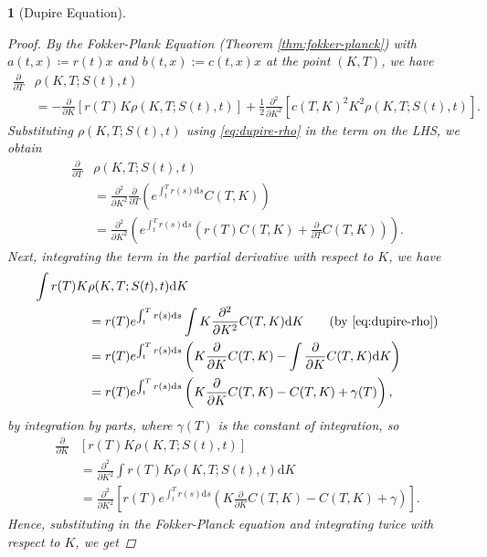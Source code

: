 \documentclass[english]{article}
\numberwithin{equation}{section}
\numberwithin{figure}{section}
\theoremstyle{bolddescit}
\newtheorem{theorem}{\protect\theoremname}[section]
\theoremstyle{definition}
\theoremstyle{definition}
\theoremstyle{plain}
\theoremstyle{plain}
\theoremstyle{bolddesc}
\theoremstyle{plain}
\theoremstyle{remark}
\providecommand{\theoremname}{Theorem}
\begin{document}
\begin{theorem}[Dupire Equation]
\begin{proof}
    By the Fokker-Plank Equation (Theorem \ref{thm:fokker-planck}) with $a(t,x) \coloneq r(t) x$ and $b(t,x) := c(t,x) x$ at the point $(K,T)$, we have
    \begin{align*}
      \frac{\partial}{\partial T}&\rho(K,T;S(t),t)\\
      &= - \frac{\partial}{\partial K}[r(T) K \rho(K,T;S(t),t)]
        + \frac{1}{2} \frac{\partial^2}{\partial K^2}[c(T,K)^2 K^2 \rho(K,T;S(t),t)].
    \end{align*}
    Substituting $\rho(K,T;S(t),t)$ using \eqref{eq:dupire-rho} in the term on the LHS, we obtain
    \begin{align*}
      \frac{\partial}{\partial T}&\rho(K,T;S(t),t)\\
      &= \frac{\partial^2}{\partial K^2} \frac{\partial}{\partial T}\left(e^{\int_t^T r(s) \mathrm{d}s} C(T,K)\right) \tag{by Schwarz's Theorem since $\rho \in C^2$}\\
      &= \frac{\partial^2}{\partial K^2} \left(e^{\int_t^T r(s) \mathrm{d}s} \left(r(T) C(T,K) + \frac{\partial}{\partial T}C(T,K)\right)\right).
    \end{align*}
    Next, integrating the term in the partial derivative with respect to $K$, we have
    \begin{align*}
      \int r(T) K &\rho(K,T;S(t),t) \mathrm{d}K\\
      &= r(T) e^{\int_t^T r(s) \mathrm{d}s} \int K \frac{\partial^2}{\partial K^2} C(T,K) \mathrm{d}K \tag{by \eqref{eq:dupire-rho}}\\
      &= r(T) e^{\int_t^T r(s) \mathrm{d}s} \left( K \frac{\partial}{\partial K} C(T,K) - \int \frac{\partial}{\partial K} C(T,K) \mathrm{d}K \right)\\
      &= r(T) e^{\int_t^T r(s) \mathrm{d}s} \left( K \frac{\partial}{\partial K} C(T,K) - C(T,K) + \gamma(T)\right),
    \end{align*}
    by integration by parts, where $\gamma(T)$ is the constant of integration, so
    \begin{align*}
      \frac{\partial}{\partial K} &[r(T) K \rho(K,T;S(t),t)]\\
      &= \frac{\partial^2}{\partial K^2} \int r(T) K \rho(K,T;S(t),t) \mathrm{d}K\\
      &= \frac{\partial^2}{\partial K^2} \left[r(T) e^{\int_t^T r(s) \mathrm{d}s} \left( K \frac{\partial}{\partial K} C(T,K) - C(T,K) + \gamma\right)\right].
    \end{align*}
    Hence, substituting in the Fokker-Planck equation and integrating twice with respect to $K$, we get

\end{proof}
\end{theorem}
\end{document}
